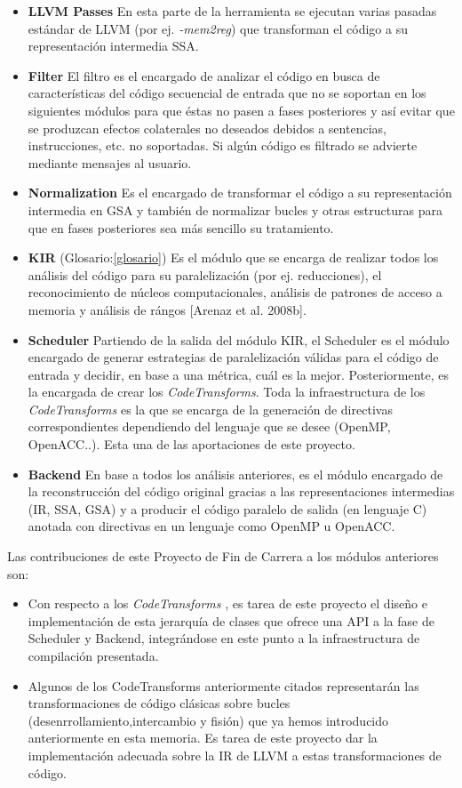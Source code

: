 \begin{itemize}
\item \textbf{LLVM Passes} En esta parte de la herramienta se ejecutan varias pasadas estándar de LLVM (por ej. \textit{-mem2reg}) que transforman el código a su representación intermedia SSA.
\item \textbf{Filter} El filtro es el encargado de analizar el código en busca de características del código secuencial de entrada que no se soportan en los siguientes módulos para que éstas no pasen a fases posteriores y así evitar que se produzcan efectos colaterales no deseados debidos a sentencias, instrucciones, etc. no soportadas. Si algún código es filtrado se advierte mediante mensajes al usuario.
\item  \textbf{Normalization} Es el encargado de transformar el código a su representación intermedia en GSA y también de normalizar bucles y otras estructuras para que en fases posteriores sea más sencillo su tratamiento.
\item \textbf{KIR} (Glosario:{\ref{glosario}}) Es el módulo que se encarga de realizar todos los análisis del código para su paralelización (por ej. reducciones), el reconocimiento de núcleos computacionales, análisis de patrones de acceso a memoria y análisis de rángos [Arenaz et al. 2008b].
\item \textbf{Scheduler} Partiendo de la salida del módulo KIR, el Scheduler es el módulo encargado de generar estrategias de paralelización válidas para el código de entrada y decidir, en base a una métrica, cuál es la mejor. Posteriormente, es la encargada de crear los \textit{CodeTransforms}. Toda la infraestructura de los \textit{CodeTransforms} es la que se encarga de la generación de directivas correspondientes dependiendo del lenguaje que se desee (OpenMP, OpenACC..). Esta una de las aportaciones de este proyecto.
\item \textbf{Backend} En base a todos los análisis anteriores, es el módulo encargado de la reconstrucción del código original gracias a las representaciones intermedias (IR, SSA, GSA) y a producir el código paralelo de salida (en lenguaje C) anotada con directivas en un lenguaje como OpenMP u OpenACC.
\end{itemize}

Las contribuciones de este Proyecto de Fin de Carrera a los módulos anteriores son:
\begin{itemize}
\item Con respecto a los \textit{CodeTransforms} , es tarea de este proyecto el diseño e implementación de esta jerarquía de clases que ofrece una API a la fase de Scheduler y Backend, integrándose en este punto a la infraestructura de compilación presentada.
\item Algunos de los CodeTransforms anteriormente citados representarán las transformaciones de código clásicas sobre bucles (desenrrollamiento,intercambio y fisión) que ya hemos introducido anteriormente en esta memoria. Es tarea de este proyecto dar la implementación adecuada sobre la IR de LLVM a estas transformaciones de código.
\end{itemize}

